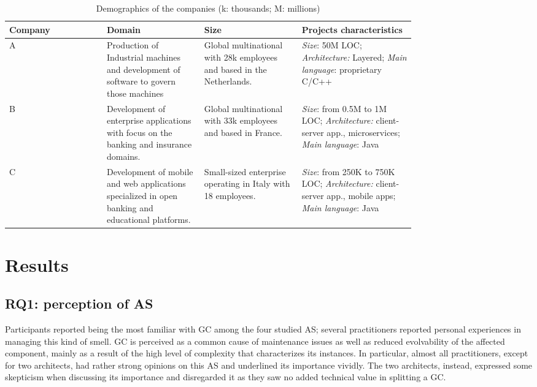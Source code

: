 \begin{table}[]
	\centering
	\footnotesize
	\caption{Demographics of the companies (k: thousands; M: millions)}
	\label{c2:tab:companies}
	\begin{tabular}{p{.08\linewidth}p{0.24\linewidth}p{0.24\linewidth}p{0.29\linewidth}}
	\toprule
	\textbf{Company} & \textbf{Domain} & \textbf{Size} & \textbf{Projects characteristics} \\ \midrule
	A & Production of Industrial machines and development of software to govern those machines & Global multinational with 28k employees and based in the Netherlands. & \textit{Size}: 50M LOC; \textit{Architecture:} Layered; \textit{Main language}: proprietary C/C++ \\
	B & Development of enterprise applications with focus on the banking and insurance domains. & Global multinational with 33k employees and based in France. & \textit{Size}: from 0.5M to 1M LOC; \textit{Architecture:} client-server app., microservices; \textit{Main language}: Java \\
	C & Development of mobile and web applications  specialized in open banking and educational platforms. & Small-sized enterprise operating in Italy with 18 employees. & \textit{Size}: from 250K to 750K LOC; \textit{Architecture:} client-server app., mobile apps; \textit{Main language}: Java \\ \bottomrule
	\end{tabular}
\end{table}

\section{Results}
\subsection{RQ1: perception of AS}
Participants reported being the most familiar with GC among the four studied AS; several practitioners reported personal experiences in managing this kind of smell. GC is perceived as a common cause of maintenance issues as well as reduced evolvability of the affected component, mainly as a result of the high level of complexity that characterizes its instances. In particular, almost all practitioners, except for two architects, had rather strong opinions on this AS and underlined its importance vividly. The two architects, instead, expressed some skepticism when discussing its importance and disregarded it as they saw no added technical value in splitting a GC.

